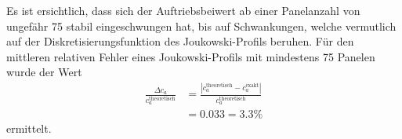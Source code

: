 Es ist ersichtlich, dass sich der Auftriebsbeiwert ab einer Panelanzahl von ungefähr 75 stabil eingeschwungen hat, bis auf Schwankungen, welche vermutlich auf der Diskretisierungsfunktion des Joukowski-Profils beruhen. Für den mittleren relativen Fehler eines Joukowski-Profils mit mindestens 75 Panelen wurde der Wert
\begin{align*}
\frac{\Delta c_a}{c_a^\mathrm{theoretisch}} &= \frac{|c_a^\mathrm{theoretisch} - c_a^\mathrm{exakt}|}{c_a^\mathrm{theoretisch}} \\
& = 0.033 = 3.3 \%
\end{align*}
ermittelt. \cite{Abello2018} \cite{Barba:2019}
